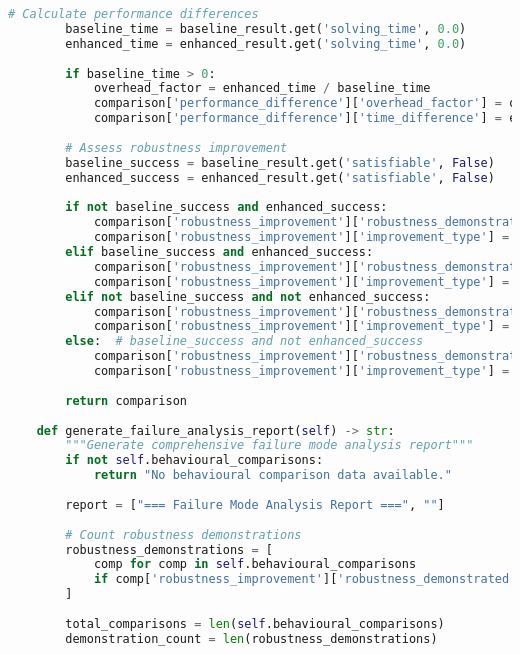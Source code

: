 \begin{lstlisting}[language=Python, caption=Systematic Failure Mode Analysis and Recovery Validation]
        # Calculate performance differences
        baseline_time = baseline_result.get('solving_time', 0.0)
        enhanced_time = enhanced_result.get('solving_time', 0.0)
        
        if baseline_time > 0:
            overhead_factor = enhanced_time / baseline_time
            comparison['performance_difference']['overhead_factor'] = overhead_factor
            comparison['performance_difference']['time_difference'] = enhanced_time - baseline_time
        
        # Assess robustness improvement
        baseline_success = baseline_result.get('satisfiable', False)
        enhanced_success = enhanced_result.get('satisfiable', False)
        
        if not baseline_success and enhanced_success:
            comparison['robustness_improvement']['robustness_demonstrated'] = True
            comparison['robustness_improvement']['improvement_type'] = 'failure_recovery'
        elif baseline_success and enhanced_success:
            comparison['robustness_improvement']['robustness_demonstrated'] = False
            comparison['robustness_improvement']['improvement_type'] = 'both_successful'
        elif not baseline_success and not enhanced_success:
            comparison['robustness_improvement']['robustness_demonstrated'] = False
            comparison['robustness_improvement']['improvement_type'] = 'both_failed'
        else:  # baseline_success and not enhanced_success
            comparison['robustness_improvement']['robustness_demonstrated'] = False
            comparison['robustness_improvement']['improvement_type'] = 'enhanced_regression'
        
        return comparison
    
    def generate_failure_analysis_report(self) -> str:
        """Generate comprehensive failure mode analysis report"""
        if not self.behavioural_comparisons:
            return "No behavioural comparison data available."
        
        report = ["=== Failure Mode Analysis Report ===", ""]
        
        # Count robustness demonstrations
        robustness_demonstrations = [
            comp for comp in self.behavioural_comparisons 
            if comp['robustness_improvement']['robustness_demonstrated']
        ]
        
        total_comparisons = len(self.behavioural_comparisons)
        demonstration_count = len(robustness_demonstrations)
        

\end{lstlisting}

